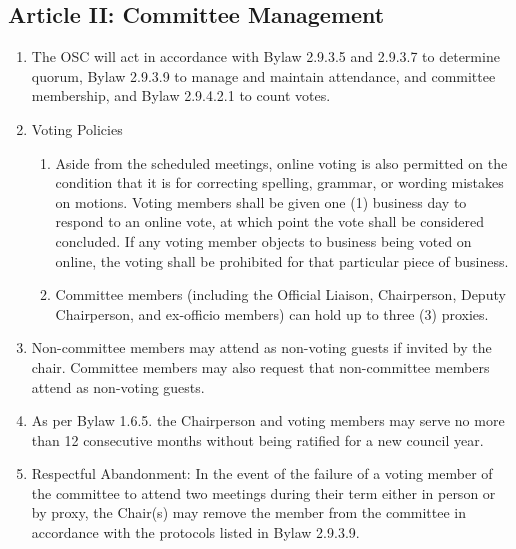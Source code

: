 \subsection{Article II: Committee Management}
\begin{enumerate}[label*=\arabic*., align=left]	
\item The OSC will act in accordance with Bylaw 2.9.3.5 and 2.9.3.7 to determine quorum, Bylaw 2.9.3.9 to manage and maintain attendance, and committee membership, and Bylaw 2.9.4.2.1 to count votes.
\item Voting Policies
\begin{enumerate}[label*=\arabic*., align=left]	
\item Aside from the scheduled meetings, online voting is also permitted on the condition that it is for correcting spelling, grammar, or wording mistakes on motions. Voting members shall be given one (1) business day to respond to an online vote, at which point the vote shall be considered concluded. If any voting member objects to business being voted on online, the voting shall be prohibited for that particular piece of business.
\item Committee members (including the Official Liaison, Chairperson, Deputy Chairperson, and ex-officio members) can hold up to three (3) proxies.
\end{enumerate}
\item Non-committee members may attend as non-voting guests if invited by the chair. Committee members may also request that non-committee members attend as non-voting guests.	
\item As per Bylaw 1.6.5. the Chairperson and voting members may serve no more than 12 consecutive months without being ratified for a new council year.
\item Respectful Abandonment: In the event of the failure of a voting member of the committee to attend two meetings during their term either in person or by proxy, the Chair(s) may remove the member from the committee in accordance with the protocols listed in Bylaw 2.9.3.9.
\end{enumerate}



